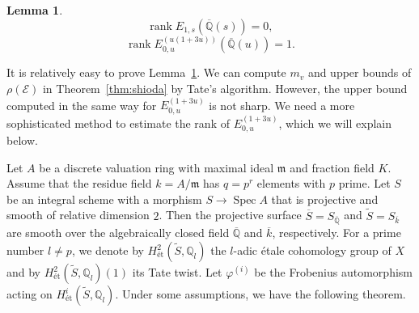 \documentclass[a4paper]{jarticle} %
\theoremstyle{definition}
\newtheorem{thm}{Theorem}[section]
\newtheorem{lem}[thm]{Lemma}
\theoremstyle{remark}
\DeclareMathOperator{\rank}{rank}
\DeclareMathOperator{\NS}{NS}
\DeclareMathOperator{\Spec}{Spec}
\begin{document}
\begin{lem}
    \label{lem:easyranks}
    \begin{equation*}
        \rank E_{1,s}(\overline{\mathbb{Q}}(s)) = 0,
    \end{equation*}
    \begin{equation*}
        \rank E_{0,u}^{(u(1 + 3u))}(\overline{\mathbb{Q}}(u)) = 1.
    \end{equation*}
\end{lem}
It is relatively easy to prove Lemma~\ref{lem:easyranks}.
We can compute $m_v$ and upper bounds of $\rho(\mathcal{E})$ in Theorem~\ref{thm:shioda} by Tate's algorithm.
However, the upper bound computed in the same way for $E_{0,u}^{(1 + 3u)}$ is not sharp.
We need a more sophisticated method to estimate the rank of $E_{0,u}^{(1 + 3u)}$, which we will explain below.

Let $A$ be a discrete valuation ring with maximal ideal $\mathfrak{m}$ and fraction field $K$.
Assume that the residue field $k=A/\mathfrak{m}$ has $q=p^r$ elements with $p$ prime.
Let $S$ be an integral scheme with a morphism $S \to \Spec A$ that is projective and smooth of relative dimension $2$.
Then the projective surface $\overline{S}=S_{\overline{\mathbb{Q}}}$ and $\tilde{S}=S_{\overline{k}}$ are smooth over the algebraically closed field $\overline{\mathbb{Q}}$ and $\overline{k}$, respectively.
For a prime number $l \neq p$, we denote by $H_{\text{\'et}}^{2}(\tilde{S}, \mathbb{Q}_l)$ the $l$-adic \'etale cohomology group of $X$ and by $H_{\text{\'et}}^{2}(\tilde{S}, \mathbb{Q}_l)(1)$ its Tate twist.
Let $\varphi^(i)$ be the Frobenius automorphism acting on $H_{\text{\'et}}^{i}(\tilde{S}, \mathbb{Q}_l)$.
Under some assumptions, we have the following theorem.

\end{document}

